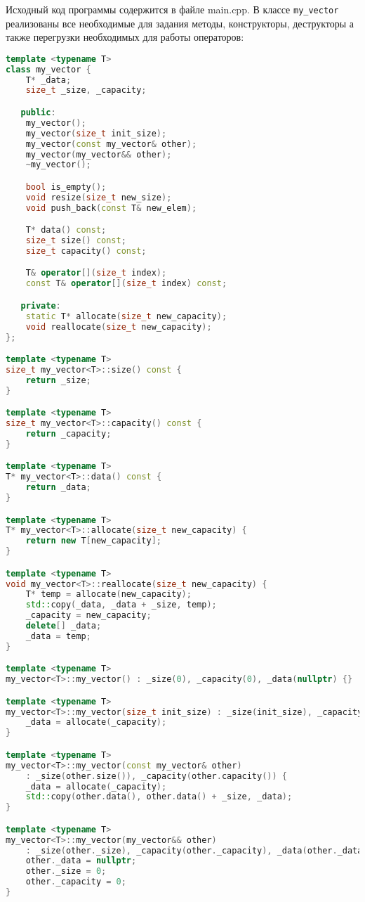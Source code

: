 \documentclass[12pt]{article}
\begin{document}
Исходный код программы содержится в файле main.cpp.
В классе \texttt{my\_vector} реализованы все необходимые для задания методы, конструкторы, деструкторы а также перегрузки необходимых для работы операторов:
\begin{lstlisting}[language=C++]
template <typename T>
class my_vector {
    T* _data;
    size_t _size, _capacity;

   public:
    my_vector();
    my_vector(size_t init_size);
    my_vector(const my_vector& other);
    my_vector(my_vector&& other);
    ~my_vector();

    bool is_empty();
    void resize(size_t new_size);
    void push_back(const T& new_elem);

    T* data() const;
    size_t size() const;
    size_t capacity() const;

    T& operator[](size_t index);
    const T& operator[](size_t index) const;

   private:
    static T* allocate(size_t new_capacity);
    void reallocate(size_t new_capacity);
};

template <typename T>
size_t my_vector<T>::size() const {
    return _size;
}

template <typename T>
size_t my_vector<T>::capacity() const {
    return _capacity;
}

template <typename T>
T* my_vector<T>::data() const {
    return _data;
}

template <typename T>
T* my_vector<T>::allocate(size_t new_capacity) {
    return new T[new_capacity];
}

template <typename T>
void my_vector<T>::reallocate(size_t new_capacity) {
    T* temp = allocate(new_capacity);
    std::copy(_data, _data + _size, temp);
    _capacity = new_capacity;
    delete[] _data;
    _data = temp;
}

template <typename T>
my_vector<T>::my_vector() : _size(0), _capacity(0), _data(nullptr) {}

template <typename T>
my_vector<T>::my_vector(size_t init_size) : _size(init_size), _capacity(init_size) {
    _data = allocate(_capacity);
}

template <typename T>
my_vector<T>::my_vector(const my_vector& other)
    : _size(other.size()), _capacity(other.capacity()) {
    _data = allocate(_capacity);
    std::copy(other.data(), other.data() + _size, _data);
}

template <typename T>
my_vector<T>::my_vector(my_vector&& other)
    : _size(other._size), _capacity(other._capacity), _data(other._data) {
    other._data = nullptr;
    other._size = 0;
    other._capacity = 0;
}


\end{lstlisting}
\end{document}
